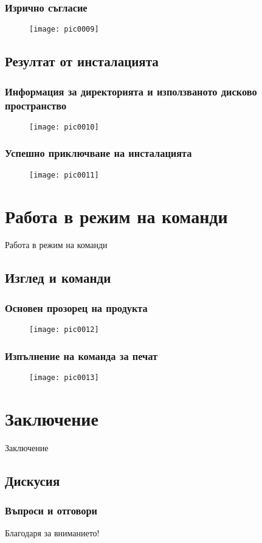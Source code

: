 \documentclass{beamer}
\begin{document}
\begin{frame}
\frametitle{Изрично съгласие}
\begin{figure}[]\texttt{[image: pic0009]}\end{figure}
\end{frame}

\subsection{Резултат от инсталацията}

\begin{frame}
\frametitle{Информация за директорията и използваното дисково пространство}
\begin{figure}[]\texttt{[image: pic0010]}\end{figure}
\end{frame}

\begin{frame}
\frametitle{Успешно приключване на инсталацията}
\begin{figure}[]\texttt{[image: pic0011]}\end{figure}
\end{frame}

\section{Работа в режим на команди}

\begin{frame}
\center \huge{Работа в режим на команди}
\end{frame}

\subsection{Изглед и команди}

\begin{frame}
\frametitle{Основен прозорец на продукта}
\begin{figure}[]\texttt{[image: pic0012]}\end{figure}
\end{frame}

\begin{frame}
\frametitle{Изпълнение на команда за печат}
\begin{figure}[]\texttt{[image: pic0013]}\end{figure}
\end{frame}

\section{Заключение}

\begin{frame}
\center \huge{Заключение}
\end{frame}

\subsection{Дискусия}

\begin{frame}
\frametitle{Въпроси и отговори}
\center \huge{Благодаря за вниманието!}
\end{frame}
\end{document}
